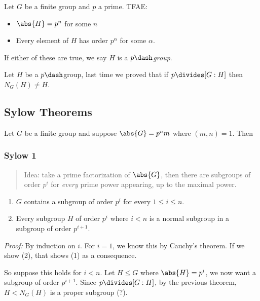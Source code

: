 Let \(G\) be a finite group and \(p\) a prime. TFAE:

\begin{itemize}
\tightlist
\item
  \(\abs{H} = p^n\) for some \(n\)
\item
  Every element of \(H\) has order \(p^\alpha\) for some \(\alpha\).
\end{itemize}

If either of these are true, we say \(H\) is a \emph{\(p\dash\)group}.

Let \(H\) be a \(p\dash\)group, last time we proved that if
\(p \divides [G : H]\) then \(N_G(H) \neq H\).

\hypertarget{sylow-theorems}{%
\subsection{Sylow Theorems}\label{sylow-theorems}}

Let \(G\) be a finite group and suppose \(\abs{G} = p^n m\) where
\((m, n) = 1\). Then

\hypertarget{sylow-1}{%
\subsubsection{Sylow 1}\label{sylow-1}}

\begin{quote}
Idea: take a prime factorization of \(\abs{G}\), then there are
subgroups of order \(p^i\) for \emph{every} prime power appearing, up to
the maximal power.
\end{quote}

\begin{enumerate}
\def\labelenumi{\arabic{enumi}.}
\tightlist
\item
  \(G\) contains a subgroup of order \(p^i\) for every
  \(1 \leq i \leq n\).
\item
  Every subgroup \(H\) of order \(p^i\) where \(i < n\) is a normal
  subgroup in a subgroup of order \(p^{i+1}\).
\end{enumerate}

\emph{Proof:} By induction on \(i\). For \(i=1\), we know this by
Cauchy's theorem. If we show (2), that shows (1) as a consequence.

So suppose this holds for \(i < n\). Let \(H \leq G\) where
\(\abs{H} = p^i\), we now want a subgroup of order \(p^{i+1}\). Since
\(p\divides [G: H]\), by the previous theorem, \(H < N_G(H)\) is a
proper subgroup (?).

